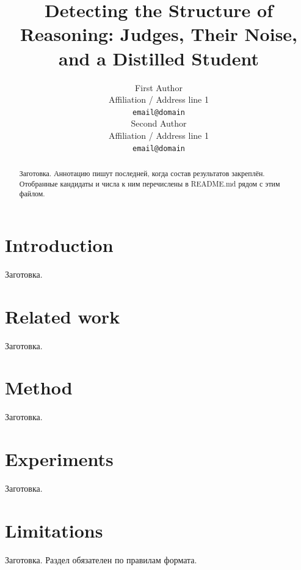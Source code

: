 \documentclass[11pt]{article}
\title{Detecting the Structure of Reasoning: Judges, Their Noise, and a Distilled Student}
\author{First Author \\
  Affiliation / Address line 1 \\
  \texttt{email@domain} \\\And
  Second Author \\
  Affiliation / Address line 1 \\
  \texttt{email@domain} \\}
\begin{document}
\maketitle

\begin{abstract}
Заготовка. Аннотацию пишут последней, когда состав результатов закреплён.
Отобранные кандидаты и числа к ним перечислены в README.md рядом с этим файлом.
\end{abstract}

\section{Introduction}

Заготовка.

\section{Related work}

Заготовка.

\section{Method}

Заготовка.

\section{Experiments}

Заготовка.

\section{Limitations}

Заготовка. Раздел обязателен по правилам формата.



\end{document}
